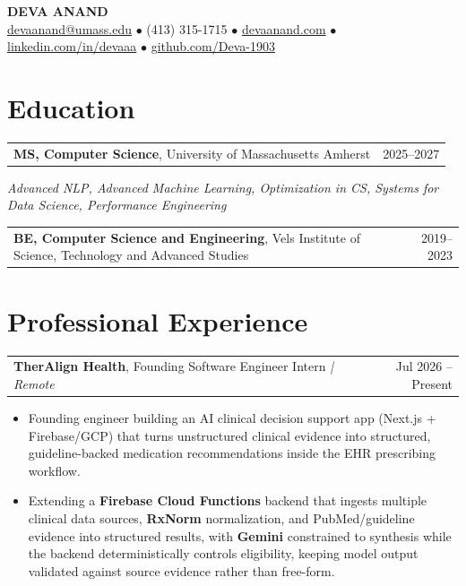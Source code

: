 \documentclass[letterpaper,11pt]{article}
\makeatletter
\newcommand{\eduItem}[3]{%
  \begin{tabular*}{\textwidth}{@{}l@{\extracolsep{\fill}}r@{}}
    \textbf{#1}, #2 & #3 \\
  \end{tabular*}\par
}
\newcommand{\expItem}[4]{%
  \vspace{2pt}
  \begin{tabular*}{\textwidth}{@{}l@{\extracolsep{\fill}}r@{}}
    \textbf{#1}, #2 \textit{| #3} & #4 \\
  \end{tabular*}\par\vspace{-3pt}
}
\makeatother
\begin{document}
\begin{center}
    {\fontsize{18}{20}\selectfont\bfseries DEVA ANAND}\\ \vspace{3pt}
    {\small
    \href{mailto:devaanand@umass.edu}{devaanand@umass.edu}
    \enspace$\bullet$\enspace
    (413) 315-1715
    \enspace$\bullet$\enspace
    \href{https://devaanand.com}{devaanand.com}
    \enspace$\bullet$\enspace
    \href{https://linkedin.com/in/devaaa/}{linkedin.com/in/devaaa}
    \enspace$\bullet$\enspace
    \href{https://github.com/Deva-1903}{github.com/Deva-1903}}
\end{center}
\vspace{-8pt}

\section{Education}
\eduItem{MS, Computer Science}{University of Massachusetts Amherst}{2025--2027}
{\small\textit{Advanced NLP, Advanced Machine Learning, Optimization in CS, Systems for Data Science, Performance Engineering}}\par
\vspace{3pt}
\eduItem{BE, Computer Science and Engineering}{Vels Institute of Science, Technology and Advanced Studies}{2019--2023}

\section{Professional Experience}

\expItem{TherAlign Health}{Founding Software Engineer Intern}{Remote}{Jul 2026 -- Present}
\begin{itemize}
  \item Founding engineer building an AI clinical decision support app (Next.js + Firebase/GCP) that turns unstructured clinical evidence into structured, guideline-backed medication recommendations inside the EHR prescribing workflow.
  \item Extending a \textbf{Firebase Cloud Functions} backend that ingests multiple clinical data sources, \textbf{RxNorm} normalization, and PubMed/guideline evidence into structured results, with \textbf{Gemini} constrained to synthesis while the backend deterministically controls eligibility, keeping model output validated against source evidence rather than free-form.
\end{itemize}
\end{document}
